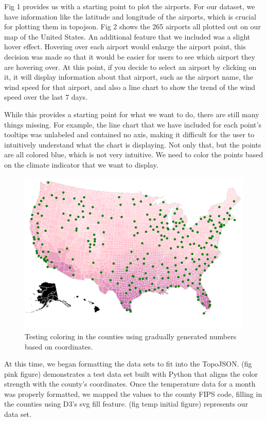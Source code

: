 \documentclass[10pt,twocolumn,twoside]{opticajnl}
\begin{document}
Fig 1 provides us with a starting point to plot the airports. For our dataset, we have information like the latitude and longitude of the airports, which is crucial for plotting them in topojson. Fig 2 shows the 265 airports all plotted out on our map of the United States. An additional feature that we included was a slight hover effect. Hovering over each airport would enlarge the airport point, this decision was made so that it would be easier for users to see which airport they are hovering over. At this point, if you decide to select an airport by clicking on it, it will display information about that airport, such as the airport name, the wind speed for that airport, and also a line chart to show the trend of the wind speed over the last 7 days.

While this provides a starting point for what we want to do, there are still many things missing. For example, the line chart that we have included for each point's tooltips was unlabeled and contained no axis, making it difficult for the user to intuitively understand what the chart is displaying. Not only that, but the points are all colored blue, which is not very intuitive. We need to color the points based on the climate indicator that we want to display.

\begin{figure}
	\centering
	\includegraphics[scale=0.25]{images/pinkStatesGradual.png}
	\caption{Testing coloring in the counties using gradually generated numbers based on coordinates.}
\end{figure}

At this time, we began formatting the data sets to fit into the TopoJSON. (fig pink figure) demonstrates a test data set built with Python that aligns the color strength with the county's coordinates. Once the temperature data for a month was properly formatted, we mapped the values to the county FIPS code, filling in the counties using D3's svg fill feature. (fig temp initial figure) represents our data set. 
\end{document}
